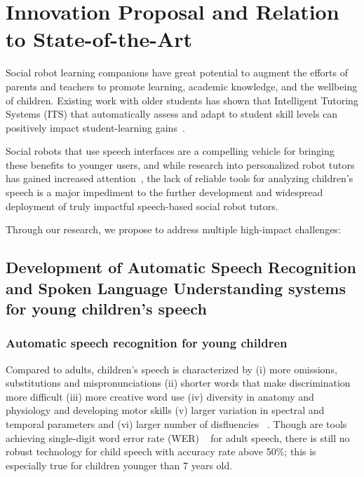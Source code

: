 \section{Innovation Proposal and Relation to State-of-the-Art}

Social robot learning companions have great potential to augment the efforts of parents and teachers to promote learning, academic knowledge, and the wellbeing of children. Existing work with older students has shown that Intelligent Tutoring Systems (ITS) that automatically assess and adapt to student skill levels can positively impact student-learning gains~\cite{desmarais2012review}. 


Social robots that use speech interfaces are a compelling vehicle for bringing these benefits to younger users, and while research into personalized robot tutors has gained increased attention~\cite{leyzberg2014personalizing}, the lack of reliable tools for analyzing children's speech is a major impediment to the further development and widespread deployment of truly impactful speech-based social robot tutors.

Through our research, we propose to address multiple high-impact challenges:

\subsection{Development of Automatic Speech Recognition and Spoken Language Understanding systems for young children's speech}
\label{section_ASR}
\subsubsection{Automatic speech recognition for young children}
Compared to adults, children's speech is characterized by (i) more omissions, substitutions and mispronunciations (ii) shorter words that make discrimination more difficult (iii) more creative word use (iv) diversity in anatomy and physiology and developing motor skills (v) larger variation in spectral and temporal parameters and (vi) larger number of disfluencies ~\cite{kennedy2017child, fainberg2016improving}. Though are tools achieving single-digit word error rate (WER) ~\cite{saon2015ibm, price2009assessment} for adult speech, there is still no robust technology for child speech with accuracy rate above 50\%; this is especially true for children younger than 7 years old.

